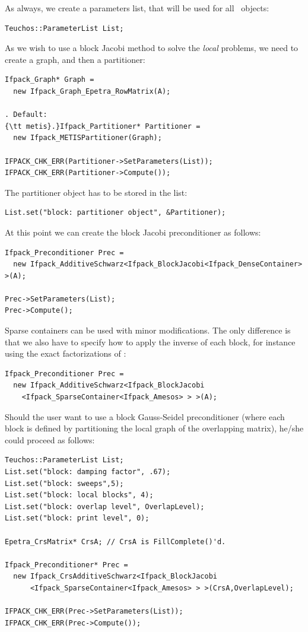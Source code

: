 As always, we create a parameters list, that will be used
for all \ifpack\ objects:
\begin{verbatim}
Teuchos::ParameterList List;
\end{verbatim}
As we wish to use a block Jacobi method to solve the {\sl local} problems, we
need to create a graph, and then a partitioner:
\begin{verbatim}
Ifpack_Graph* Graph = 
  new Ifpack_Graph_Epetra_RowMatrix(A);

. Default:
{\tt metis}.}Ifpack_Partitioner* Partitioner = 
  new Ifpack_METISPartitioner(Graph);

IFPACK_CHK_ERR(Partitioner->SetParameters(List));
IFPACK_CHK_ERR(Partitioner->Compute());
\end{verbatim}
The partitioner object has to be stored in the list:
\begin{verbatim}
List.set("block: partitioner object", &Partitioner);
\end{verbatim}
At this point we can create the block Jacobi preconditioner as follows:
\begin{verbatim}
Ifpack_Preconditioner Prec = 
  new Ifpack_AdditiveSchwarz<Ifpack_BlockJacobi<Ifpack_DenseContainer> >(A);

Prec->SetParameters(List);
Prec->Compute();
\end{verbatim}

Sparse containers can be used with minor modifications. The only difference is
that we also have to specify how to apply the inverse of each block, for
instance using the exact factorizations of \amesos:
\begin{verbatim}
Ifpack_Preconditioner Prec = 
  new Ifpack_AdditiveSchwarz<Ifpack_BlockJacobi
    <Ifpack_SparseContainer<Ifpack_Amesos> > >(A);
\end{verbatim}



Should the user want to use a block Gauss-Seidel preconditioner (where each
block is defined by partitioning the local graph of the overlapping matrix),
he/she could proceed as follows:
\begin{verbatim}
Teuchos::ParameterList List;
List.set("block: damping factor", .67);
List.set("block: sweeps",5);
List.set("block: local blocks", 4);
List.set("block: overlap level", OverlapLevel);
List.set("block: print level", 0);

Epetra_CrsMatrix* CrsA; // CrsA is FillComplete()'d.

Ifpack_Preconditioner* Prec =
  new Ifpack_CrsAdditiveSchwarz<Ifpack_BlockJacobi
      <Ifpack_SparseContainer<Ifpack_Amesos> > >(CrsA,OverlapLevel);

IFPACK_CHK_ERR(Prec->SetParameters(List));
IFPACK_CHK_ERR(Prec->Compute());
\end{verbatim}

